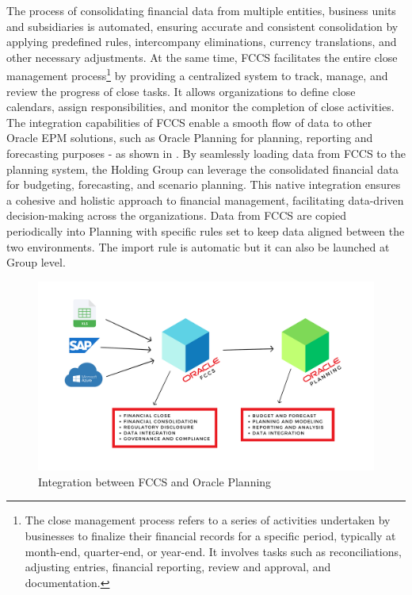 \documentclass[12pt,a4paper,openright,twoside]{book}
\begin{document}
The process of consolidating financial data from multiple entities, business units and subsidiaries is automated, ensuring accurate and consistent consolidation by applying predefined rules, intercompany eliminations, currency translations, and other necessary adjustments.
%
At the same time, FCCS facilitates the entire close management process\footnote{The close management process refers to a series of activities undertaken by businesses to finalize their financial records for a specific period, typically at month-end, quarter-end, or year-end. It involves tasks such as reconciliations, adjusting entries, financial reporting, review and approval, and documentation.} by providing a centralized system to track, manage, and review the progress of close tasks. 
%
It allows organizations to define close calendars, assign responsibilities, and monitor the completion of close activities.
%
The integration capabilities of FCCS enable a smooth flow of data to other Oracle EPM solutions, such as Oracle Planning for planning, reporting and forecasting purposes - as shown in .
%
By seamlessly loading data from FCCS to the planning system, the Holding Group can leverage the consolidated financial data for budgeting, forecasting, and scenario planning. 
%
This native integration ensures a cohesive and holistic approach to financial management, facilitating data-driven decision-making across the organizations.
%
Data from FCCS are copied periodically into Planning with specific rules set to keep data aligned between the two environments.
%
The import rule is automatic but it can also be launched at Group level. 

\begin{figure}[htbp]
	\centering
	\includegraphics[width=\linewidth]{figures/planning-fccs.pdf}
	\caption{Integration between FCCS and Oracle Planning}
	\label{fig:planning-fccs}
\end{figure}
\end{document}
